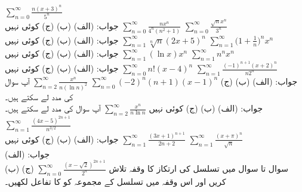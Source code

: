   $\sum\limits_{n=0}^{\infty}\frac{n(x+3)^n}{5^n}$\\
جواب:\quad
(الف)   (ب)   (ج)  کوئی نہیں
  $\sum\limits_{n=0}^{\infty}\frac{nx^n}{4^n(n^2+1)}$
  $\sum\limits_{n=0}^{\infty}\frac{\sqrt{n}x^n}{3^n}$\\
جواب:\quad
(الف)   (ب)   (ج)  کوئی نہیں
  $\sum\limits_{n=1}^{\infty}\sqrt[n]{n}(2x+5)^n$
  $\sum\limits_{n=1}^{\infty}\big(1+\frac{1}{n}\big)^nx^n$\\
جواب:\quad
(الف)   (ب)   (ج)  کوئی نہیں
  $\sum\limits_{n=1}^{\infty}(\ln x)x^n$
  $\sum\limits_{n=1}^{\infty}n^nx^n$\\
جواب:\quad
(الف)   (ب)   (ج)  کوئی نہیں
  $\sum\limits_{n=0}^{\infty}n!(x-4)^n$
  $\sum\limits_{n=1}^{\infty}\frac{(-1)^{n+1}(x+2)^n}{n2^n}$\\
جواب:\quad
(الف)   (ب)   (ج)  
  $\sum\limits_{n=0}^{\infty}(-2)^n(n+1)(x-1)^n$
  $\sum\limits_{n=2}^{\infty}\frac{x^n}{n(\ln n)^2}$\quad
آپ سوال  کی مدد لے سکتے ہیں۔\\
جواب:\quad
(الف)   (ب)   (ج)  کوئی نہیں
  $\sum\limits_{n=2}^{\infty}\frac{x^n}{n\ln n}$\quad
آپ سوال  کی مدد لے سکتے ہیں۔
  $\sum\limits_{n=1}^{\infty}\frac{(4x-5)^{2n+1}}{n^{3/2}}$\\
جواب:\quad
(الف)   (ب)   (ج)  کوئی نہیں
  $\sum\limits_{n=1}^{\infty}\frac{(3x+1)^{n+1}}{2n+2}$
  $\sum\limits_{n=1}^{\infty}\frac{(x+\pi)^n}{\sqrt{n}}$\\
جواب:\quad
(الف)  \\ (ب)   (ج)  
  $\sum\limits_{n=0}^{\infty}\frac{(x-\sqrt{2})^{2n+1}}{2^n}$
سوال  تا سوال  میں تسلسل کی ارتکاز کا وقفہ تلاش کریں اور اس وقفہ میں تسلسل کے مجموعہ کو  کا تفاعل لکھیں۔

